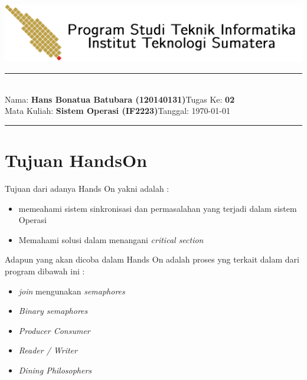 \documentclass[11pt,a4paper]{article}
\newcommand{\stuid}{120140131}
\newcommand{\student}{\textbf{Hans Bonatua Batubara (\stuid{})}}
\newcommand{\course}{\textbf{Sistem Operasi (IF2223)}}
\newcommand{\assignment}{\textbf{02}} %
\begin{document}
\thispagestyle{empty}
\begin{center}
	\includegraphics[scale = 0.15]{Figure/ifitera-header.png}
	\vspace{0.1cm}
\end{center}
\noindent
{\large
\rule{17cm}{0.2cm}\\[0.3cm]
Nama: \student \hfill Tugas Ke: \assignment\\[0.1cm]
Mata Kuliah: \course \hfill Tanggal: \today\\
\rule{17cm}{0.05cm}
\vspace{0.1cm}
}



\section{Tujuan HandsOn}
Tujuan dari adanya Hands On yakni adalah : 
\begin{itemize}
	\item memeahami sistem sinkronisasi dan permasalahan yang terjadi dalam sistem Operasi
	\item Memahami solusi dalam menangani \textit{critical section}
\end{itemize}
Adapun yang akan dicoba dalam Hands On adalah proses yng terkait dalam dari program dibawah ini :
		\begin{itemize}
			\item \textit{join} mengunakan \textit{semaphores}
			\item \textit{Binary semaphores}
			\item \textit{Producer Consumer}
			\item \textit{Reader / Writer}
			\item \textit{Dining Philosophers}
		\end{itemize}
\end{document}
